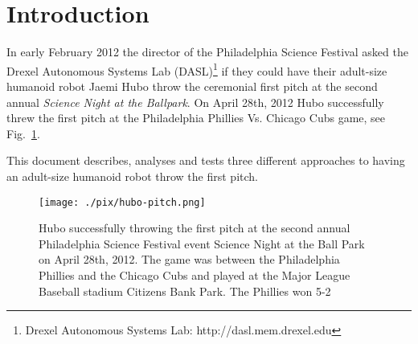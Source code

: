 \section{Introduction}
In early February 2012 the director of the Philadelphia Science Festival asked the Drexel Autonomous Systems Lab (DASL)\footnote{Drexel Autonomous Systems Lab: http://dasl.mem.drexel.edu}\label{foot:dasl} if they could have their adult-size humanoid robot Jaemi Hubo throw the ceremonial first pitch at the second annual \textit{Science Night at the Ballpark}.  On April 28th, 2012 Hubo successfully threw the first pitch at the Philadelphia Phillies Vs. Chicago Cubs game, see Fig.~\ref{fig:hubo-throw}.  

  This document describes, analyses and tests three different approaches to having an adult-size humanoid robot throw the first pitch.  

\begin{figure}[t]
  \centering
\texttt{[image: ./pix/hubo-pitch.png]}
  \caption{Hubo successfully throwing the first pitch at the second annual Philadelphia Science Festival event Science Night at the Ball Park on April 28th, 2012.  The game was between the Philadelphia Phillies and the Chicago Cubs and played at the Major League Baseball stadium Citizens Bank Park.  The Phillies won 5-2}
  \label{fig:hubo-throw}
\end{figure}


